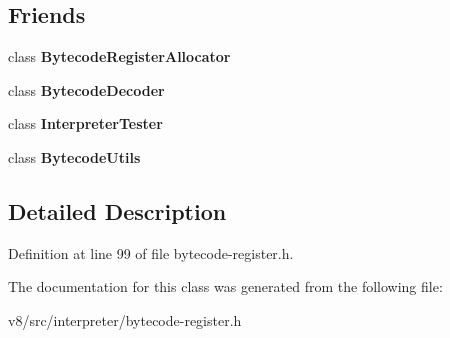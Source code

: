 \subsection*{Friends}
\begin{DoxyCompactItemize}
\item 
\mbox{\label{classv8_1_1internal_1_1interpreter_1_1RegisterList_a6c4ddb408c6a194cb1f6eefea239cd51}} 
class {\bfseries Bytecode\+Register\+Allocator}
\item 
\mbox{\label{classv8_1_1internal_1_1interpreter_1_1RegisterList_a69cf0e03758290c3cb0c49f6ed8195db}} 
class {\bfseries Bytecode\+Decoder}
\item 
\mbox{\label{classv8_1_1internal_1_1interpreter_1_1RegisterList_acc5f26aec62168c28e7499ce7b4a6312}} 
class {\bfseries Interpreter\+Tester}
\item 
\mbox{\label{classv8_1_1internal_1_1interpreter_1_1RegisterList_ae8d02a798a2138364dc3627269603247}} 
class {\bfseries Bytecode\+Utils}
\end{DoxyCompactItemize}


\subsection{Detailed Description}


Definition at line 99 of file bytecode-\/register.\+h.



The documentation for this class was generated from the following file\+:\begin{DoxyCompactItemize}
\item 
v8/src/interpreter/bytecode-\/register.\+h\end{DoxyCompactItemize}
